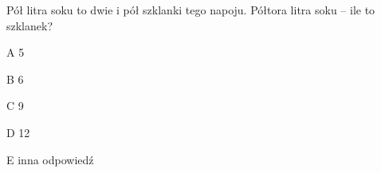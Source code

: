 \begin{tresc}
Pół litra soku to dwie i pół szklanki tego napoju. Półtora litra soku – ile to szklanek?
\end{tresc}
\begin{wariant}{A} 5 \end{wariant}
\begin{wariant}{B} 6 \end{wariant}
\begin{wariant}{C} 9 \end{wariant}
\begin{wariant}{D} 12 \end{wariant}
\begin{wariant}{E} inna odpowiedź \end{wariant}
